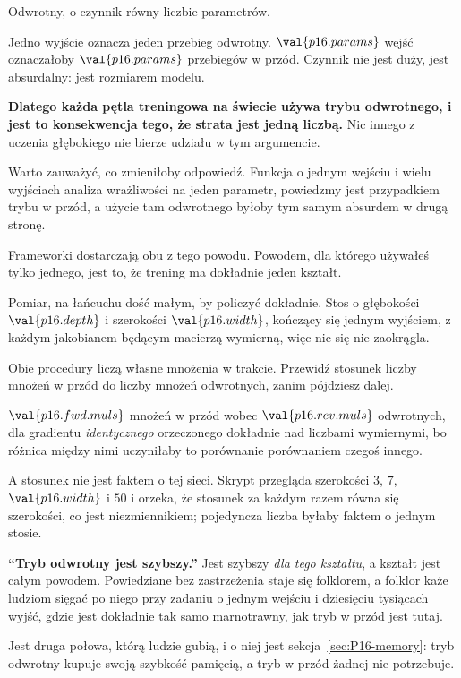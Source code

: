 \begin{fr}
\begin{ansblock}
Odwrotny, o czynnik równy liczbie parametrów.
\end{ansblock}

Jedno wyjście oznacza jeden przebieg odwrotny. $\val{p16.params}$ wejść
oznaczałoby $\val{p16.params}$ przebiegów w przód. Czynnik nie jest duży, jest
absurdalny: jest rozmiarem modelu.

\textbf{Dlatego każda pętla treningowa na świecie używa trybu odwrotnego, i
jest to konsekwencja tego, że strata jest jedną liczbą.} Nic innego z uczenia
głębokiego nie bierze udziału w tym argumencie.

\begin{aibox}
Warto zauważyć, co zmieniłoby odpowiedź. Funkcja o jednym wejściu i wielu
wyjściach \dash{} analiza wrażliwości na jeden parametr, powiedzmy \dash{}
jest przypadkiem trybu w przód, a użycie tam odwrotnego byłoby tym samym
absurdem w drugą stronę.

Frameworki dostarczają obu z tego powodu. Powodem, dla którego używałeś tylko
jednego, jest to, że trening ma dokładnie jeden kształt.
\end{aibox}
\end{fr}

\begin{fr}
Pomiar, na łańcuchu dość małym, by policzyć dokładnie. Stos o głębokości
$\val{p16.depth}$ i szerokości $\val{p16.width}$, kończący się jednym
wyjściem, z każdym jakobianem będącym macierzą wymierną, więc nic się nie
zaokrągla.

Obie procedury liczą własne mnożenia w trakcie. Przewidź stosunek liczby
mnożeń w przód do liczby mnożeń odwrotnych, zanim pójdziesz dalej.
\dotline
\nextframe
\end{fr}

\begin{fr}
$\val{p16.fwd.muls}$ mnożeń w przód wobec $\val{p16.rev.muls}$ odwrotnych, dla
gradientu \emph{identycznego} \dash{} orzeczonego dokładnie nad liczbami
wymiernymi, bo różnica między nimi uczyniłaby to porównanie porównaniem czegoś
innego.

A stosunek nie jest faktem o tej sieci. Skrypt przegląda szerokości $3$, $7$,
$\val{p16.width}$ i $50$ i orzeka, że stosunek za każdym razem równa się
szerokości, co jest niezmiennikiem; pojedyncza liczba byłaby faktem o jednym
stosie.

\begin{trapbox}
\textbf{\enquote{Tryb odwrotny jest szybszy.}} Jest szybszy \emph{dla tego
kształtu}, a kształt jest całym powodem. Powiedziane bez zastrzeżenia staje się
folklorem, a folklor każe ludziom sięgać po niego przy zadaniu o jednym wejściu
i dziesięciu tysiącach wyjść, gdzie jest dokładnie tak samo marnotrawny, jak
tryb w przód jest tutaj.

Jest druga połowa, którą ludzie gubią, i o niej jest
sekcja~\ref{sec:P16-memory}: tryb odwrotny
kupuje swoją szybkość pamięcią, a tryb w przód żadnej nie potrzebuje.
\end{trapbox}
\end{fr}

